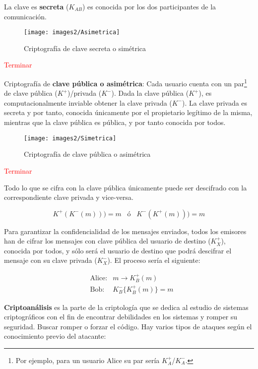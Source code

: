 \documentclass[10pt,portrait, twocolumn]{article}
\begin{document}
	La clave es \textbf{secreta} ($K_{AB}$) es conocida por los dos participantes de la comunicación.\\
	
	\begin{figure}[ht!]
	\centering
	\texttt{[image: images2/Asimetrica]}
	\caption{Criptografía de clave secreta o simétrica}
	\label{fig:Triada}
	\end{figure}	
	
	\textcolor{red}{Terminar}
	
Criptografía de \textbf{clave pública o asimétrica}: Cada usuario cuenta con un par\footnote{Por ejemplo, para un usuario Alice su par sería $K_{A}^{+}$/$K_{A}^{-}$.} de clave pública ($K^{+}$)/privada ($K^{-}$). Dada la clave pública ($K^{+}$), es computacionalmente inviable obtener la clave privada ($K^{-}$). La clave privada es secreta y por tanto, conocida únicamente por el propietario legítimo de la misma, mientras que la clave pública es pública, y por tanto conocida por todos.\\

	\begin{figure}[ht!]
	\centering
	\texttt{[image: images2/Simetrica]}
	\caption{Criptografía de clave pública o asimétrica}
	\label{fig:Triada}
	\end{figure}
	\textcolor{red}{Terminar}

Todo lo que se cifra con la clave pública únicamente puede ser descifrado con la correspondiente clave privada y vice-versa.

	\begin{equation*}
		K^+(K^-(m))) = m \hspace{10pt} \text{ó} \hspace{10pt} K^-(K^+(m))) = m
	\end{equation*}
	
Para garantizar la confidencialidad de los mensajes enviados, todos los emisores han de cifrar los mensajes con clave pública del usuario de destino ($K_{X}^{+}$), conocida por todos,  y sólo será el usuario de destino que podrá descifrar el mensaje con su clave privada ($K_{X}^{-}$). El proceso sería el siguiente:

\begin{eqnarray*}
&\text{Alice:}& m \rightarrow K_{B}^{+}(m)\\
&\text{Bob:}& K_{B}^{-} \{ K_{B}^{+} (m) \} = m
\end{eqnarray*}

	
\textbf{Criptoanálisis} es la parte de la criptología que se dedica al estudio de sistemas criptográficos con el fin de encontrar debilidades en los sistemas y romper su seguridad. Buscar romper o forzar el código. Hay varios tipos de ataques según el conocimiento previo del atacante:
\end{document}
